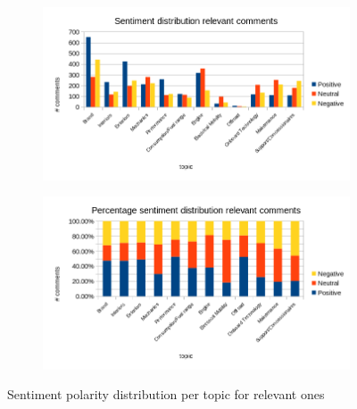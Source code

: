 \begin{figure}[ht]
	\centering
	\begin{subfigure}{1\textwidth} %
		\includegraphics[width=1\textwidth]{figures/charts/sentiment-distribution.png}
		\label{fig:sentiment-distribution}
	\end{subfigure}
	\begin{subfigure}{1\textwidth} %
		\includegraphics[width=1\textwidth]{figures/charts/sentiment-distribution-perc.png}
		\label{fig:sentiment-distribution-perc}
	\end{subfigure}
	\caption{Sentiment polarity distribution per topic for relevant ones} %
	\label{fig:annotations-relevant}
\end{figure}



















